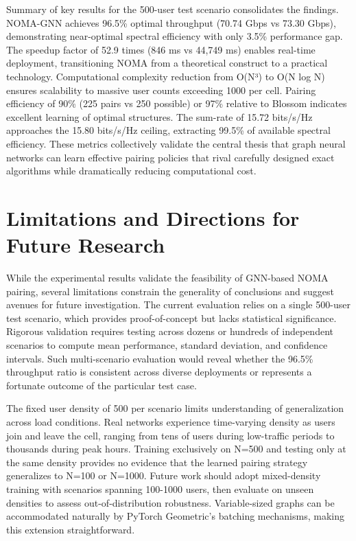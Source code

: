 Summary of key results for the 500-user test scenario consolidates the findings. NOMA-GNN achieves 96.5\% optimal throughput (70.74 Gbps vs 73.30 Gbps), demonstrating near-optimal spectral efficiency with only 3.5\% performance gap. The speedup factor of 52.9 times (846 ms vs 44,749 ms) enables real-time deployment, transitioning NOMA from a theoretical construct to a practical technology. Computational complexity reduction from O(N³) to O(N log N) ensures scalability to massive user counts exceeding 1000 per cell. Pairing efficiency of 90\% (225 pairs vs 250 possible) or 97\% relative to Blossom indicates excellent learning of optimal structures. The sum-rate of 15.72 bits/s/Hz approaches the 15.80 bits/s/Hz ceiling, extracting 99.5\% of available spectral efficiency. These metrics collectively validate the central thesis that graph neural networks can learn effective pairing policies that rival carefully designed exact algorithms while dramatically reducing computational cost.

\section{Limitations and Directions for Future Research}

While the experimental results validate the feasibility of GNN-based NOMA pairing, several limitations constrain the generality of conclusions and suggest avenues for future investigation. The current evaluation relies on a single 500-user test scenario, which provides proof-of-concept but lacks statistical significance. Rigorous validation requires testing across dozens or hundreds of independent scenarios to compute mean performance, standard deviation, and confidence intervals. Such multi-scenario evaluation would reveal whether the 96.5\% throughput ratio is consistent across diverse deployments or represents a fortunate outcome of the particular test case.

The fixed user density of 500 per scenario limits understanding of generalization across load conditions. Real networks experience time-varying density as users join and leave the cell, ranging from tens of users during low-traffic periods to thousands during peak hours. Training exclusively on N=500 and testing only at the same density provides no evidence that the learned pairing strategy generalizes to N=100 or N=1000. Future work should adopt mixed-density training with scenarios spanning 100-1000 users, then evaluate on unseen densities to assess out-of-distribution robustness. Variable-sized graphs can be accommodated naturally by PyTorch Geometric's batching mechanisms, making this extension straightforward.

